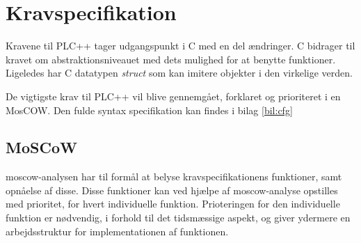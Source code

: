 \section{Kravspecifikation}
Kravene til PLC++ tager udgangspunkt i C med en del ændringer. C bidrager til kravet om abstraktionsniveauet med dets mulighed for at benytte funktioner. Ligeledes har C datatypen \textit{struct} som kan imitere objekter i den virkelige verden.

De vigtigste krav til PLC++ vil blive gennemgået, forklaret og prioriteret i en MosCOW. Den fulde syntax specifikation kan findes i bilag \ref{bil:cfg}

\subsection{MoSCoW}
\gls{moscow}-analysen har til formål at belyse kravspecifikationens funktioner, samt opnåelse af disse.
Disse funktioner kan ved hjælpe af \gls{moscow}-analyse opstilles med prioritet, for hvert individuelle funktion.
Prioteringen for den individuelle funktion er nødvendig, i forhold til det tidsmæssige aspekt, og giver ydermere en arbejdsstruktur for implementationen af funktionen.

